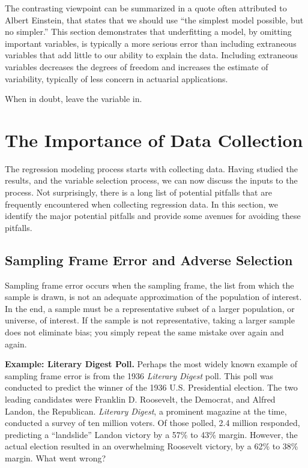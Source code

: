 The contrasting viewpoint can be summarized in a quote often
attributed to Albert Einstein, that states that we should use ``the
simplest model possible, but no simpler.'' This section demonstrates
that underfitting a model, by omitting important variables, is
typically a more serious error than including extraneous variables
that add little to our ability to explain the data. Including
extraneous variables decreases the degrees of freedom and increases
the estimate of variability, typically of less concern in actuarial
applications.

When in doubt, leave the variable in.

\section{The Importance of Data Collection}

The regression modeling process starts with collecting data. Having
studied the results, and the variable selection process, we can now
discuss the inputs to the process. Not surprisingly, there is a long
list of potential pitfalls that are frequently encountered when
collecting regression data. In this section, we identify the major
potential pitfalls and provide some avenues for avoiding these
pitfalls.

\subsection{Sampling Frame Error and Adverse
Selection}

Sampling frame error occurs when the sampling frame, the list from
which the sample is drawn, is not an adequate approximation of the
population of interest. In the end, a sample must be a
representative subset of a larger population, or universe, of
interest. If the sample is not representative, taking a larger
sample does not eliminate bias; you simply repeat the same mistake
over again and again.

\linejed{}

\noindent \textbf{Example: Literary Digest
Poll.} Perhaps the most widely
known example of sampling frame error is from the 1936
\textit{Literary Digest} poll. This poll was conducted to predict
the winner of the 1936 U.S. Presidential election. The two leading
candidates were Franklin D. Roosevelt, the Democrat, and Alfred
Landon, the Republican. \textit{Literary Digest}, a prominent
magazine at the time, conducted a survey of ten million voters. Of
those polled, 2.4 million responded, predicting a ``landslide''
Landon victory by a 57\% to 43\% margin. However, the actual
election resulted in an overwhelming Roosevelt victory, by a 62\% to
38\% margin. What went wrong?

